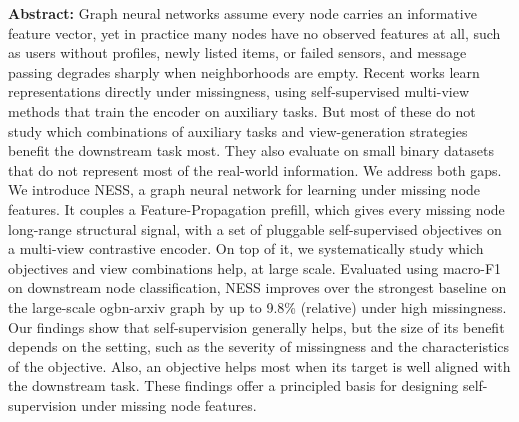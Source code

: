 \textbf{Abstract:} Graph neural networks assume every node carries an informative feature vector, yet in practice many nodes have no observed features at all, such as users without profiles, newly listed items, or failed sensors, and message passing degrades sharply when neighborhoods are empty. 
Recent works learn representations directly under missingness, using self-supervised multi-view methods that train the encoder on auxiliary tasks. But most of these do not study which combinations of auxiliary tasks and view-generation strategies benefit the downstream task most. They also evaluate on small binary datasets that do not represent most of the real-world information.
We address both gaps. We introduce NESS, a graph neural network for learning under missing node features. It couples a Feature-Propagation prefill, which gives every missing node long-range structural signal, with a set of pluggable self-supervised objectives on a multi-view contrastive encoder. On top of it, we systematically study which objectives and view combinations help, at large scale.
Evaluated using macro-F1 on downstream node classification, NESS improves over the strongest baseline on the large-scale ogbn-arxiv graph by up to 9.8\% (relative) under high missingness.
Our findings show that self-supervision generally helps, but the size of its benefit depends on the setting, such as the severity of missingness and the characteristics of the objective.
Also, an objective helps most when its target is well aligned with the downstream task.
These findings offer a principled basis for designing self-supervision under missing node features.
